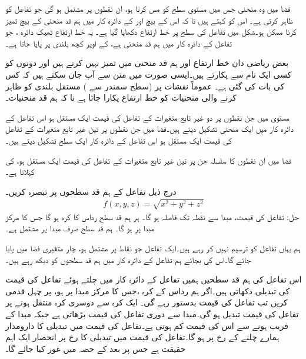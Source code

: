 فضا میں وہ منحنی جس میں  مستوی   سطح  کو مس کرتا   ہو،  ان نقطوں پر مشتمل ہو گی  جو تفاعل  کو ظاہر کرتی ہے۔ اس کو  کہتے ہیں تا کہ اس کے   بیچ  اور    کے دائرہ کار  میں  ہم قد منحنی کے بیچ  تمیز کرنا ممکن ہو۔شکل   میں تفاعل  کی سطح  پر  خط ارتفاع   دکھایا گیا ہے۔ یہ خط ارتفاع ٹھیک دائرہ  ، جو تفاعل کے دائرہ کار میں  ہم قد  منحنی  ہے، کے اوپر کچھ بلندی پر پایا جاتا ہے۔

 بعض ریاضی دان  خط ارتفاع اور  ہم قد  منحنی میں تمیز نہیں کرتے ہیں اور دونوں کو کسی ایک نام سے پکارتے ہیں۔ایسی صورت میں   متن سے آپ جان سکتے ہیں کہ کس کی بات کی گئی ہے۔ عموماً نقشات  پر  (سطح سمندر سے )   مستقل بلندی کو ظاہر کرنے والی منحنیات کو  خط ارتفاع  پکارا جاتا ہے نا کہ  ہم قد  منحنیات۔

مستوی میں جن نقطوں پر   دو غیر تابع  متغیرات کے  تفاعل  کی قیمت ایک مستقل  ہو اس تفاعل کے دائرہ کار میں ایک منحنی تشکیل دیتے ہیں۔فضا میں  جن نقطوں پر تین غیر تابع متغیرات کے تفاعل کی قیمت ایک مستقل   ہو  اس تفاعل کے دائرہ کار  ایک سطح تشکیل دیتے ہیں۔

فضا میں ان نقطوں    کا سلسلہ جن پر تین غیر تابع متغیرات کے تفاعل کی قیمت ایک مستقل  ہو،  کی  کہلاتا ہے۔

درج ذیل تفاعل کے ہم قد  سطحوں پر تبصرہ کریں۔
\begin{align*}
f(x,y,z)=\sqrt{x^2+y^2+z^2}
\end{align*}
حل:\quad
تفاعل  کی قیمت،   مبدا سے نقطہ  تک فاصلہ   ہو گا۔ ہر  ہم قد  سطح  رداس  کا کرہ ہو گا جس کا مرکز مبدا پر ہو گا۔   ہم قد  سطح   صرف مبدا پر مشتمل ہے۔

ہم یہاں تفاعل کو ترسیم نہیں کر رہے ہیں۔ایک تفاعل جو نقاط   پر مشتمل ہو،  چار متغیری فضا  میں پایا جائے گا۔اس کی بجائے  ہم تفاعل کے دائرہ کار میں  ہم قد  سطحوں کو دیکھ رہے ہیں۔

 اس تفاعل کی  ہم قد  سطحیں ہمیں   تفاعل کے دائرہ کار  میں  چلتے ہوئے تفاعل کی قیمت کی تبدیلی  دکھاتی ہیں۔اگر ہم رداس  کے کرہ ،جس کا مرکز مبدا پر ہو،   پر چہل قدمی  کریں  تب تفاعل کی قیمت بدستور  رہے گی۔ ایک کرہ سے دوسری کرہ  منتقل ہونے پر تفاعل کی قیمت تبدیل ہو گی۔مبدا سے دوری    تفاعل کی قیمت بڑھاتی ہے جبکہ مبدا کے قریب ہونے سے اس کی قیمت کم ہوتی ہے۔تفاعل کی قیمت میں تبدیلی کا دارومدار ہمارے چلنے کے رخ پر ہو گا۔تفاعل کی قیمت میں تبدیلی کا رخ پر انحصار ایک اہم حقیقت ہے جس پر بعد کے حصہ میں غور کیا جائے گا۔ 

